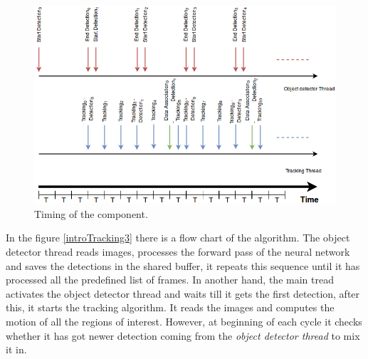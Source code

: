 \begin{figure}[H]
\centering         
\includegraphics[width=14cm]{timesDiagram/timing3.png}
\caption{Timing of the component.} \label{software2timin}
\end{figure}


In the figure \ref{introTracking3} there is a flow chart of the algorithm. The object detector thread reads images, processes the forward pass of the neural network and saves the detections in the shared buffer, it repeats this sequence until it has processed all the predefined list of frames. In another hand, the main tread activates the object detector thread and waits till it gets the first detection, after this, it starts the tracking algorithm. It reads the images and computes the motion of all the regions of interest. However, at beginning of each cycle it checks whether it has got newer detection coming from the \textit{object detector thread} to mix it in.

